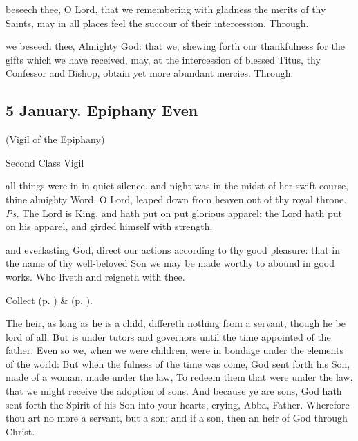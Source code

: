 \secret\label{TitusSecret}
 beseech thee, O Lord, that we remembering with gladness the merits of thy Saints, may in all places feel the succour of their intercession. Through.

\postcommunion\label{TitusPostcommunion}
 we beseech thee, Almighty God: that we, shewing forth our thankfulness for the gifts which we have received, may, at the intercession of blessed Titus, thy Confessor and Bishop, obtain yet more abundant mercies. Through.


\clearpage
\subsection{5 January. Epiphany Even}

\centerline{\small{(Vigil of the Epiphany)}}

\begin{inhead}
	Second Class Vigil
\end{inhead}


\introit
{} all things were in in quiet silence, and night was in the midst of her swift course, thine almighty Word, O Lord, leaped down from heaven out of thy royal throne. \textit{Ps.} The Lord is King, and hath put on put glorious apparel: the Lord hath put on his apparel, and girded himself with strength.

\collect
{} and everlasting God, direct our actions according to thy good pleasure: that in the name of thy well-beloved Son we may be made worthy to abound in good works. Who liveth and reigneth with thee.

\begin{rubric}
	 Collect  (p. \pageref{TelesphorusCollect}) \&   (p. \pageref{SPMaryPostChristmas}).
\end{rubric}

 The heir, as long as he is a child, differeth nothing from a servant, though he be lord of all; But is under tutors and governors until the time appointed of the father. Even so we, when we were children, were in bondage under the elements of the world: But when the fulness of the time was come, God sent forth his Son, made of a woman, made under the law, To redeem them that were under the law, that we might receive the adoption of sons. And because ye are sons, God hath sent forth the Spirit of his Son into your hearts, crying, Abba, Father. Wherefore thou art no more a servant, but a son; and if a son, then an heir of God through Christ.

